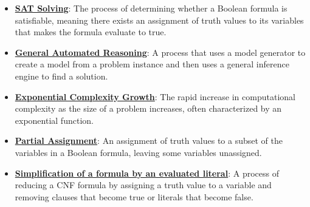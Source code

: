 \documentclass{article}%
\begin{document}
\begin{itemize}[leftmargin=*]%
\item \href{https://purdue.brightspace.com/d2l/common/assets/pdfjs-d2l-dist/1.0.14-legacy/web/viewer.html?file=%2Fcontent%2Fenforced%2F1095467-wl.202510.CS.24300.001%2F15L2-SAT.pdf%3Fou%3D1095467&lang=en-us&container=d2l-fileviewer-rendered-pdf&fullscreen=d2l-fileviewer-rendered-pdf-dialog&height=667#page=2}{\textbf{SAT Solving}}: The process of determining whether a Boolean formula is satisfiable, meaning there exists an assignment of truth values to its variables that makes the formula evaluate to true.%
\item \href{https://purdue.brightspace.com/d2l/common/assets/pdfjs-d2l-dist/1.0.14-legacy/web/viewer.html?file=%2Fcontent%2Fenforced%2F1095467-wl.202510.CS.24300.001%2F15L2-SAT.pdf%3Fou%3D1095467&lang=en-us&container=d2l-fileviewer-rendered-pdf&fullscreen=d2l-fileviewer-rendered-pdf-dialog&height=667#page=3}{\textbf{General Automated Reasoning}}: A process that uses a model generator to create a model from a problem instance and then uses a general inference engine to find a solution.%
\item \href{https://purdue.brightspace.com/d2l/common/assets/pdfjs-d2l-dist/1.0.14-legacy/web/viewer.html?file=%2Fcontent%2Fenforced%2F1095467-wl.202510.CS.24300.001%2F15L2-SAT.pdf%3Fou%3D1095467&lang=en-us&container=d2l-fileviewer-rendered-pdf&fullscreen=d2l-fileviewer-rendered-pdf-dialog&height=667#page=4}{\textbf{Exponential Complexity Growth}}: The rapid increase in computational complexity as the size of a problem increases, often characterized by an exponential function.%
\item \href{https://purdue.brightspace.com/d2l/common/assets/pdfjs-d2l-dist/1.0.14-legacy/web/viewer.html?file=%2Fcontent%2Fenforced%2F1095467-wl.202510.CS.24300.001%2F15L2-SAT.pdf%3Fou%3D1095467&lang=en-us&container=d2l-fileviewer-rendered-pdf&fullscreen=d2l-fileviewer-rendered-pdf-dialog&height=667#page=14}{\textbf{Partial Assignment}}: An assignment of truth values to a subset of the variables in a Boolean formula, leaving some variables unassigned.%
\item \href{https://purdue.brightspace.com/d2l/common/assets/pdfjs-d2l-dist/1.0.14-legacy/web/viewer.html?file=%2Fcontent%2Fenforced%2F1095467-wl.202510.CS.24300.001%2F15L2-SAT.pdf%3Fou%3D1095467&lang=en-us&container=d2l-fileviewer-rendered-pdf&fullscreen=d2l-fileviewer-rendered-pdf-dialog&height=667#page=15}{\textbf{Simplification of a formula by an evaluated literal}}: A process of reducing a CNF formula by assigning a truth value to a variable and removing clauses that become true or literals that become false.%

\end{itemize}
\end{document}
